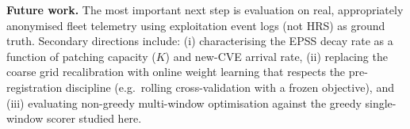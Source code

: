 \textbf{Future work.} The most important next step is evaluation on real, appropriately anonymised fleet telemetry using exploitation event logs (not HRS) as ground truth. Secondary directions include: (i) characterising the EPSS decay rate as a function of patching capacity ($K$) and new-CVE arrival rate, (ii) replacing the coarse grid recalibration with online weight learning that respects the pre-registration discipline (e.g.\ rolling cross-validation with a frozen objective), and (iii) evaluating non-greedy multi-window optimisation against the greedy single-window scorer studied here.
